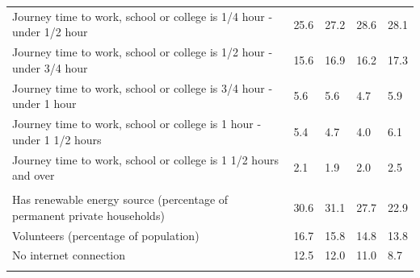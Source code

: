 \documentclass{article}
\begin{document}
\begin{table}[h]
\begin{tabular}{KTTTT}
Journey time to work, school or college is 1/4 hour - under 1/2 hour & 25.6& 27.2& 28.6& 28.1\\
Journey time to work, school or college is 1/2 hour - under 3/4 hour & 15.6& 16.9& 16.2& 17.3\\
Journey time to work, school or college is 3/4 hour - under 1 hour & 5.6& 5.6& 4.7& 5.9\\
Journey time to work, school or college is 1 hour - under 1 1/2 hours & 5.4& 4.7& 4.0& 6.1\\
Journey time to work, school or college is 1 1/2 hours and over & 2.1& 1.9& 2.0& 2.5\\
\hline
    \\ 
    \hline
Has renewable energy source (percentage of permanent private households) & 30.6& 31.1& 27.7& 22.9\\
    \hline
Volunteers (percentage of population) & 16.7& 15.8& 14.8& 13.8\\
    \hline
No internet connection& 12.5& 12.0& 11.0&  8.7\\
\hline
\end{tabular}
\end{table}
\end{document}
